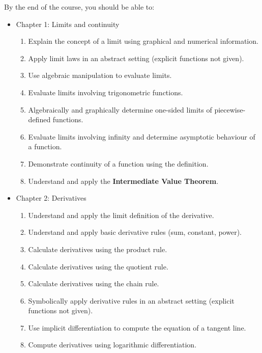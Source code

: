\documentclass[10pt,]{article}
\newcommand{\terminology}[1]{\textbf{#1}}
\begin{document}
\par
\hypertarget{p-51}{}%
By the end of the course, you should be able to: \leavevmode%
\begin{itemize}[label=]
\item{}\hypertarget{p-52}{}%
Chapter 1: Limits and continuity %
\begin{enumerate}[label=\arabic*)]
\item\hypertarget{li-39}{}Explain the concept of a limit using graphical and numerical information.%
\item\hypertarget{li-40}{}Apply limit laws in an abstract setting (explicit functions not given).%
\item\hypertarget{li-41}{}Use algebraic manipulation to evaluate limits.%
\item\hypertarget{li-42}{}Evaluate limits involving trigonometric functions.%
\item\hypertarget{li-43}{}Algebraically and graphically determine one-sided limits of piecewise-defined functions.%
\item\hypertarget{li-44}{}Evaluate limits involving infinity and determine asymptotic behaviour of a function.%
\item\hypertarget{li-45}{}Demonstrate continuity of a function using the definition.%
\item\hypertarget{li-46}{}Understand and apply the \terminology{Intermediate Value Theorem}.%
\end{enumerate}
%
\item{}\hypertarget{p-53}{}%
Chapter 2: Derivatives %
\begin{enumerate}[label=\arabic*)]
\item\hypertarget{li-48}{}Understand and apply the limit definition of the derivative.%
\item\hypertarget{li-49}{}Understand and apply basic derivative rules (sum, constant, power).%
\item\hypertarget{li-50}{}Calculate derivatives using the product rule.%
\item\hypertarget{li-51}{}Calculate derivatives using the quotient rule.%
\item\hypertarget{li-52}{}Calculate derivatives using the chain rule.%
\item\hypertarget{li-53}{}Symbolically apply derivative rules in an abstract setting (explicit functions not given).%
\item\hypertarget{li-54}{}Use implicit differentiation to compute the equation of a tangent line.%
\item\hypertarget{li-55}{}Compute derivatives using logarithmic differentiation.%

\end{enumerate}
\end{itemize}
\end{document}
